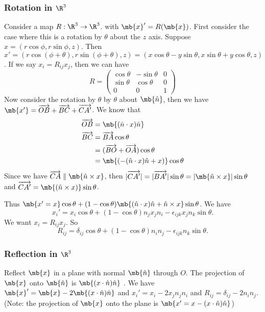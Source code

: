 \documentclass[a4paper]{article}
\begin{document}
\subsubsection{Rotation in \texorpdfstring{$\R^3$}{R3}}
Consider a map $R: \R^3 \rightarrow \R^3$. with $\mb{x}' = R(\mb{x})$. First consider the case where this is a rotation by $\theta$ about the $z$ axis.
Suppose $x = (r\cos\phi, r\sin\phi, z)$. Then $x' = (r\cos(\phi + \theta), r\sin(\phi + \theta), z) = (x\cos\theta - y\sin\theta, x\sin\theta + y\cos\theta, z)$. If we say $x_i = R_{ij} x_j$, then we can have
\[
R = \begin{pmatrix}
  \cos\theta & -\sin\theta & 0 \\
  \sin\theta & \cos\theta & 0 \\
  0 & 0 & 1
\end{pmatrix}
\]
Now consider the rotation by $\theta$ by $\theta$ about $\mb{\hat{n}}$, then we have $\mb{x'} = \overrightarrow{OB} + \overrightarrow{BC} + \overrightarrow{CA'}$.
We know that
\begin{align*}
  \overrightarrow{OB} &= \mb{(\hat{n}\cdot x)\hat{n}}\\
  \overrightarrow{BC} &= \overrightarrow{BA}\cos\theta\\
  &= (\overrightarrow{BO} + \overrightarrow{OA})\cos\theta \\
  &= \mb{(-(\hat{n}\cdot x)\hat{n} + x)}\cos\theta
\end{align*}
Since we have $\overrightarrow{CA} \parallel \mb{\hat{n}\times x}$, then $|\overrightarrow{CA'}| = |\overrightarrow{BA'}|\sin\theta  = |\mb{\hat{n}\times x}|\sin\theta$ and $\overrightarrow{CA'} = \mb{(\hat{n}\times x)}\sin\theta$.

Thus $\mb{x' = x}\cos\theta + (1 - \cos\theta)\mb{(\hat{n}\cdot x)\hat{n} + \hat{n}\times x}\sin\theta$. We have
\[
x_i' = x_i\cos\theta + (1 - \cos\theta)n_jx_jn_i - \epsilon_{ijk}x_jn_k\sin\theta.
\]
We want $x_i = R_{ij}x_j$. So
\[
R_{ij} = \delta_{ij}\cos\theta + (1 - \cos\theta)n_in_j - \epsilon_{ijk}n_k\sin\theta.
\]

\subsubsection{Reflection in \texorpdfstring{$\R^3$}{R3}}
Reflect $\mb{x}$ in a plane with normal $\mb{\hat{n}}$ through $O$. The projection of $\mb{x}$ onto $\mb{\hat{n}}$ is $\mb{(x\cdot \hat{n})\hat{n}}$ . We have $\mb{x}' = \mb{x} - 2\mb{(x\cdot \hat{n})\hat{n}}$ and $x_i' = x_i - 2x_jn_jn_i$ and $R_{ij} = \delta_{ij} - 2n_in_j$.(Note: the projection  of $\mb{x}$ onto the plane is $\mb{x' = x - (x\cdot \hat{n})\hat{n}}$)
\end{document}
